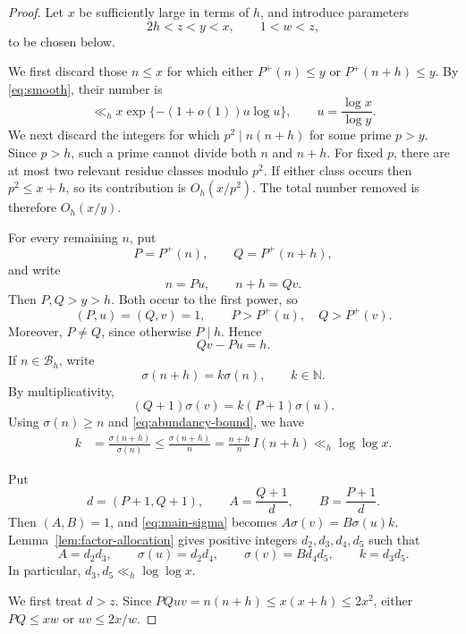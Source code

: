\documentclass[11pt,reqno]{amsart}
\numberwithin{equation}{section}
\theoremstyle{plain}
\theoremstyle{definition}
\theoremstyle{remark}
\newcommand{\N}{\mathbb N}
\begin{document}
\begin{proof}
Let $x$ be sufficiently large in terms of $h$, and introduce parameters
\[
2h<z<y<x,\qquad 1<w<z,
\]
to be chosen below.

We first discard those $n\le x$ for which either $P^+(n)\le y$ or $P^+(n+h)\le y$. By \eqref{eq:smooth}, their number is
\begin{equation}\label{eq:smooth-pruned}
\ll_h x\exp\{-(1+o(1))u\log u\},
\qquad
u=\frac{\log x}{\log y}.
\end{equation}
We next discard the integers for which $p^2\mid n(n+h)$ for some prime $p>y$. Since $p>h$, such a prime cannot divide both $n$ and $n+h$. For fixed $p$, there are at most two relevant residue classes modulo $p^2$. If either class occurs then $p^2\le x+h$, so its contribution is $O_h(x/p^2)$. The total number removed is therefore $O_h(x/y)$.

For every remaining $n$, put
\[
P=P^+(n),\qquad Q=P^+(n+h),
\]
and write
\[
n=Pu,\qquad n+h=Qv.
\]
Then $P,Q>y>h$. Both occur to the first power, so
\[
(P,u)=(Q,v)=1,
\qquad
P>P^+(u),\quad Q>P^+(v).
\]
Moreover, $P\ne Q$, since otherwise $P\mid h$. Hence
\begin{equation}\label{eq:main-dioph}
Qv-Pu=h.
\end{equation}
If $n\in\mathcal B_h$, write
\[
\sigma(n+h)=k\sigma(n),
\qquad k\in\N.
\]
By multiplicativity,
\begin{equation}\label{eq:main-sigma}
(Q+1)\sigma(v)=k(P+1)\sigma(u).
\end{equation}
Using $\sigma(n)\ge n$ and \eqref{eq:abundancy-bound}, we have
\begin{equation}\label{eq:k-bound}
\begin{aligned}
k
&=\frac{\sigma(n+h)}{\sigma(n)}
\le\frac{\sigma(n+h)}{n}
=\frac{n+h}{n}\,I(n+h)
\ll_h\log\log x.
\end{aligned}
\end{equation}

Put
\[
d=(P+1,Q+1),\qquad A=\frac{Q+1}{d},\qquad B=\frac{P+1}{d}.
\]
Then $(A,B)=1$, and \eqref{eq:main-sigma} becomes $A\sigma(v)=B\sigma(u)k$. Lemma~\ref{lem:factor-allocation} gives positive integers $d_2,d_3,d_4,d_5$ such that
\begin{equation}\label{eq:factor-allocation}
A=d_2d_3,\qquad
\sigma(u)=d_2d_4,\qquad
\sigma(v)=Bd_4d_5,\qquad
k=d_3d_5.
\end{equation}
In particular, $d_3,d_5\ll_h\log\log x$.

We first treat $d>z$. Since $PQuv=n(n+h)\le x(x+h)\le2x^2$, either $PQ\le xw$ or $uv\le2x/w$.


\end{proof}
\end{document}
